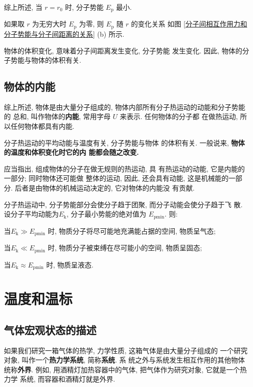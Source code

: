 \documentclass[11pt,a4paper]{ctexbook}
\begin{document}
综上所述, 当 $r = r_0$ 时, 分子势能 $E_\text{p}$ 最小.

如果取 $r$ 为无穷大时 $E_\text{p}$ 为零, 则 $E_\text{p}$ 随 $r$ 的变化关系
如图 \ref{分子间相互作用力和分子势能与分子间距离的关系} (b) 所示.

物体的体积变化, 意味着分子间距离发生变化, 分子势能
发生变化. 因此, 物体的分子势能与物体的体积有关.

\subsection{物体的内能}

综上所述, 物体是由大量分子组成的, 物体内部所有分子热运动的动能和分子势能的
总和, 叫作物体的\textbf{内能}, 常用字母 $U$ 来表示. 任何物体的分子都
在做热运动, 所以任何物体都具有内能.

分子热运动的平均动能与温度有关, 分子势能与物体
的体积有关. 一般说来, \textbf{物体的温度和体积变化时它的内
能都会随之改变.}

应当指出, 组成物体的分子在做无规则的热运动, 具
有热运动的动能, 它是内能的一部分; 同时物体还可能做
整体的运动, 因此, 还会具有动能, 这是机械能的一部
分. 后者是由物体的机械运动决定的, 它对物体的内能没
有贡献.

\bigskip

分子热运动中, 分子势能部分会使分子趋于团聚, 而分子动能会使分子趋于飞
散. 设分子平均动能为$E_\text{k}$, 分子最小势能的绝对值为 $E_\text{pmin}$. 则:

当$E_\text{k} \gg E_\text{pmin}$ 时, 物质分子将尽可能地充满能占据的空间, 物质呈气态;

当$E_\text{k} \ll E_\text{pmin}$ 时, 物质分子被束缚在尽可能小的空间, 物质呈固态;

当$E_\text{k} \approx E_\text{pmin}$ 时, 物质呈液态.

\section{温度和温标}

\subsection{气体宏观状态的描述}

如果我们研究一箱气体的热学, 力学性质, 这箱气体是由大量分子组成的
一个研究对象, 叫作一个\textbf{热力学系统}, 简称\textbf{系统}. 系
统之外与系统发生相互作用的其他物体统称\textbf{外界}.
例如, 用酒精灯加热容器中的气体, 把气体作为研究对象, 它就是一个热力学
系统, 而容器和酒精灯就是外界.
\end{document}
